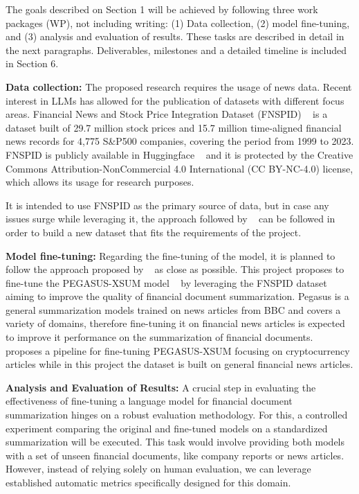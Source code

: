 The goals described on Section 1 will be achieved by following three work packages (WP), not including writing: (1) Data
collection, (2) model fine-tuning, and (3) analysis and evaluation of results.
These tasks are described in detail in the next paragraphs.
Deliverables, milestones and a detailed timeline is included in Section 6.

\textbf{Data collection:}
The proposed research requires the usage of news data.
Recent interest in LLMs has allowed for the publication of datasets with different focus areas.
Financial News and Stock Price Integration Dataset (FNSPID) ~\cite{Dong2024} is a dataset built of 29.7 million stock
prices and 15.7 million time-aligned financial news records for 4,775 S&P500 companies, covering the period from 1999 to
2023.
FNSPID is publicly available in Huggingface ~\cite{Dong2024} and it is protected by the Creative Commons
Attribution-NonCommercial 4.0 International (CC BY-NC-4.0) license, which allows its usage for research purposes.

It is intended to use FNSPID as the primary source of data, but in case any issues surge while leveraging it, the
approach followed by ~\cite{Dong2024} can be followed in order to build a new dataset that fits the requirements of the
project.


\textbf{Model fine-tuning:}
Regarding the fine-tuning of the model, it is planned to follow the approach proposed by ~\cite{Avramelou2023} as close
as possible.
This project proposes to fine-tune the PEGASUS-XSUM model ~\cite{Zhang2019} by leveraging the FNSPID dataset aiming to
improve the quality of financial document summarization.
Pegasus is a general summarization models trained on news articles from BBC and covers a variety of domains, therefore
fine-tuning it on financial news articles is expected to improve it performance on the summarization of financial documents.
~\cite{Avramelou2023} proposes a pipeline for fine-tuning PEGASUS-XSUM focusing on cryptocurrency articles while in this
project the dataset is built on general financial news articles.


\textbf{Analysis and Evaluation of Results:}
A crucial step in evaluating the effectiveness of fine-tuning a language model for financial document summarization
hinges on a robust evaluation methodology.
For this, a controlled experiment comparing the original and fine-tuned models on a standardized summarization will be
executed.
This task would involve providing both models with a set of unseen financial documents, like company reports or news
articles.
However, instead of relying solely on human evaluation, we can leverage established automatic metrics specifically
designed for this domain.

